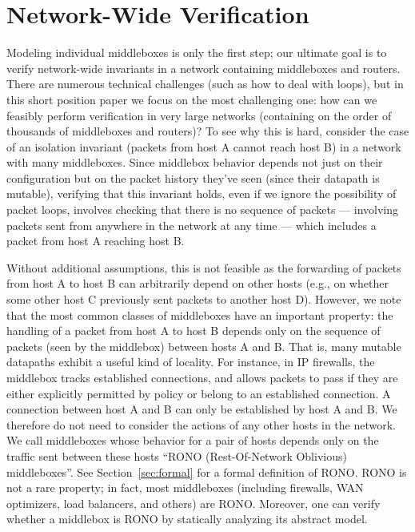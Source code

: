 \section{Network-Wide Verification}
\label{sec:modelnet}

Modeling individual middleboxes is only the first step; our ultimate goal is to verify network-wide invariants in a network containing middleboxes and routers.
There are numerous technical challenges (such as how to deal with loops), but in this short position paper we focus on the most challenging one: how can we feasibly perform verification in very large networks (containing on the order of thousands of middleboxes and routers)? To see why this is hard, consider the case of an isolation invariant (packets from host A cannot reach host B) in a network with many middleboxes. Since middlebox behavior depends not just on their configuration but on the packet history they've seen (since their datapath is mutable), verifying that this invariant holds, even if we ignore the possibility of packet loops,
involves checking that there is no sequence of packets --- involving packets sent from anywhere in the network at any time --- which includes a packet from host A reaching host B.


Without additional assumptions, this is not feasible as the forwarding of packets from host A to host B can arbitrarily depend on other hosts (e.g., on whether some other host C previously sent packets to another host D). However, we note that the most common classes of middleboxes have an important property: the handling of a packet from host A to host B depends only on the sequence of packets (seen by the middlebox) between hosts A and B. That is, many mutable datapaths exhibit a useful kind of locality.
For instance, in IP
firewalls, the middlebox tracks established connections, and allows packets to pass if they are either explicitly permitted by
policy or belong to an established connection. A connection between host A and B can only be established by host A and B. We therefore do not need to consider the
actions of any other hosts in the network. We call middleboxes whose behavior for a pair of hosts depends only on the traffic sent between these hosts ``RONO (Rest-Of-Network Oblivious) middleboxes''. See Section~\ref{sec:formal} for a formal definition of RONO. RONO is not a rare property; in fact, most middleboxes (including firewalls, WAN optimizers, load balancers, and others) are RONO.  Moreover, one can verify whether a middlebox is RONO by statically analyzing its abstract model.


